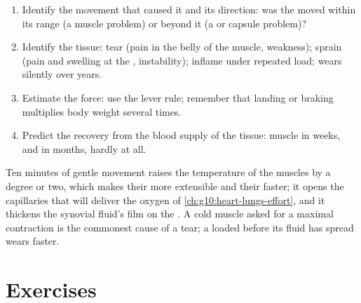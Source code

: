 \begin{method}\label{met:g10:muscles-and-joints:analyse}
\begin{enumerate}
  \item Identify the movement that caused it and its direction: was
        the  moved within its range (a muscle problem) or beyond
        it (a  or capsule problem)?
  \item Identify the tissue:  tear (pain in the belly of
        the muscle, weakness);  sprain (pain and swelling at
        the , instability);  inflame under repeated load;
         wears silently over years.
  \item Estimate the force: use the lever rule; remember that landing
        or braking multiplies body weight several times.
  \item Predict the recovery from the blood supply of the tissue:
        muscle in weeks,  and  in months, 
        hardly at all.
\end{enumerate}
\end{method}

\begin{remark}\label{rem:g10:muscles-and-joints:warmup}
Ten minutes of gentle movement raises the temperature of the muscles
by a degree or two, which makes their  more extensible and
their  faster; it opens the capillaries that will deliver the
oxygen of \cref{ch:g10:heart-lungs-effort}, and it thickens the
synovial fluid's film on the . A cold muscle asked for a
maximal contraction is the commonest cause of a tear; a  loaded
before its fluid has spread wears faster.
\end{remark}

\section{Exercises}

